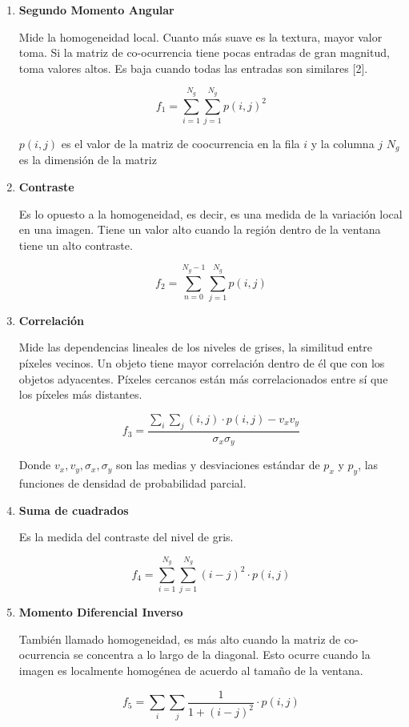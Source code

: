 \begin{enumerate}

\item \textbf{Segundo Momento Angular}

Mide la homogeneidad local. Cuanto más suave es la textura, mayor valor toma. Si la matriz de co-ocurrencia tiene pocas entradas de gran magnitud, toma valores altos. Es baja cuando todas las entradas son similares [2].

\[f_1 = \sum_{i=1}^{N_g}\sum_{j=1}^{N_g} p(i,j)^2\]

$p(i,j)$ es el valor de la matriz de coocurrencia en la fila $i$ y la columna $j$
$N_g$ es la dimensión de la matriz

\item \textbf{Contraste}

Es lo opuesto a la homogeneidad, es decir, es una medida de la variación local en una imagen. Tiene un valor alto cuando la región dentro de la ventana tiene un alto contraste.

\[f_2 = \sum_{n=0}^{N_g-1}\sum_{j=1}^{N_g} p(i,j)\]

\item \textbf{Correlación}

Mide las dependencias lineales de los niveles de grises, la similitud entre píxeles vecinos. Un objeto tiene mayor correlación dentro de él que con los objetos adyacentes. Píxeles cercanos están más correlacionados entre sí que los píxeles más distantes.

\[f_3 = \frac{\sum_i \sum_j (i,j)\cdot p(i,j) - v_xv_y}{\sigma_x\sigma_y}\]

Donde $v_x, v_y, \sigma_x, \sigma_y$ son las medias y desviaciones estándar de $p_x$ y $p_y$, las funciones de densidad de probabilidad parcial.

\item \textbf{Suma de cuadrados}

Es la medida del contraste del nivel de gris.

\[f_4 = \sum_{i=1}^{N_g}\sum_{j=1}^{N_g}(i-j)^2\cdot p(i,j)\]

\item \textbf{Momento Diferencial Inverso}

También llamado homogeneidad, es más alto cuando la matriz de co-ocurrencia se concentra a lo largo de la diagonal. Esto ocurre cuando la imagen es localmente homogénea de acuerdo al tamaño de la ventana.

\[f_5 = \sum_{i}\sum_{j}\frac{1}{1+(i-j)^2}\cdot p(i,j)\]


\end{enumerate}
